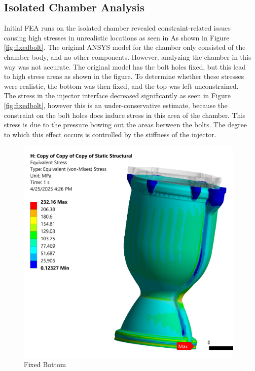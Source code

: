 \subsection{Isolated Chamber Analysis}
Initial FEA runs on the isolated chamber revealed constraint-related issues causing high stresses in unrealistic locations as seen in As shown in Figure \ref{fig:fixedbolt}. The original ANSYS model for the chamber only consisted of the chamber body, and no other components. However, analyzing the chamber in this way was not accurate. The original model has the bolt holes fixed, but this lead to high stress areas as shown in the figure. To determine whether these stresses were realistic, the bottom was then fixed, and the top was left unconstrained. The stress in the injector interface decreased significantly as seen in Figure \ref{fig:fixedbolt}, however this is an under-conservative estimate, because the constraint on the bolt holes does induce stress in this area of the chamber. This stress is due to the pressure bowing out the areas between the bolts. The degree to which this effect occurs is controlled by the stiffness of the injector.
\begin{figure}
    \centering
    \includegraphics[width=1\linewidth]{bottomfixed.png}
    \caption{Fixed Bottom}
    \label{fig:Fixed Bottom}
\end{figure}
